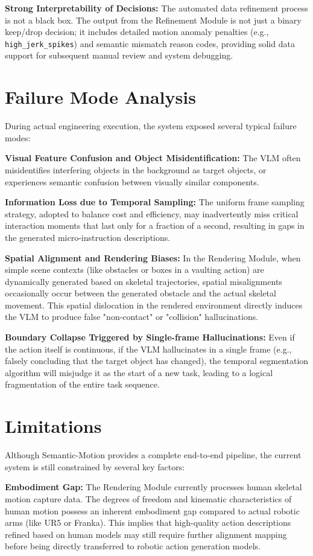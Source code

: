 \documentclass[11pt,oneside]{report}
\begin{document}
\textbf{Strong Interpretability of Decisions:} The automated data refinement process is not a black box. The output from the Refinement Module is not just a binary keep/drop decision; it includes detailed motion anomaly penalties (e.g., \texttt{high\_jerk\_spikes}) and semantic mismatch reason codes, providing solid data support for subsequent manual review and system debugging.

\section{Failure Mode Analysis}
During actual engineering execution, the system exposed several typical failure modes:

\textbf{Visual Feature Confusion and Object Misidentification:} The VLM often misidentifies interfering objects in the background as target objects, or experiences semantic confusion between visually similar components.

\textbf{Information Loss due to Temporal Sampling:} The uniform frame sampling strategy, adopted to balance cost and efficiency, may inadvertently miss critical interaction moments that last only for a fraction of a second, resulting in gaps in the generated micro-instruction descriptions.

\textbf{Spatial Alignment and Rendering Biases:} In the Rendering Module, when simple scene contexts (like obstacles or boxes in a vaulting action) are dynamically generated based on skeletal trajectories, spatial misalignments occasionally occur between the generated obstacle and the actual skeletal movement. This spatial dislocation in the rendered environment directly induces the VLM to produce false "non-contact" or "collision" hallucinations.

\textbf{Boundary Collapse Triggered by Single-frame Hallucinations:} Even if the action itself is continuous, if the VLM hallucinates in a single frame (e.g., falsely concluding that the target object has changed), the temporal segmentation algorithm will misjudge it as the start of a new task, leading to a logical fragmentation of the entire task sequence.

\section{Limitations}
Although Semantic-Motion provides a complete end-to-end pipeline, the current system is still constrained by several key factors:

\textbf{Embodiment Gap:} The Rendering Module currently processes human skeletal motion capture data. The degrees of freedom and kinematic characteristics of human motion possess an inherent embodiment gap compared to actual robotic arms (like UR5 or Franka). This implies that high-quality action descriptions refined based on human models may still require further alignment mapping before being directly transferred to robotic action generation models.
\end{document}
